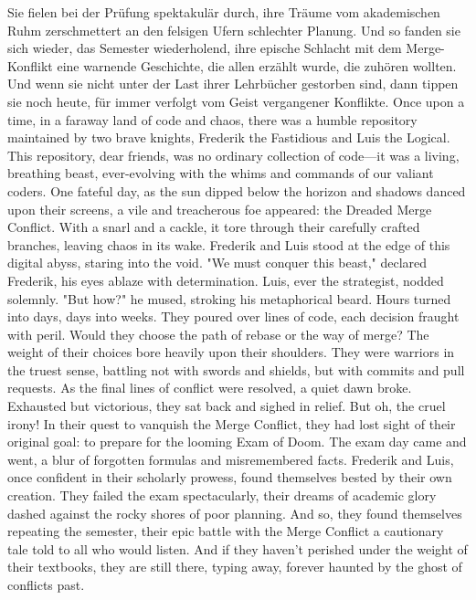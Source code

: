 {    Sie fielen bei der Prüfung spektakulär durch, ihre Träume vom akademischen Ruhm zerschmettert an den felsigen Ufern schlechter Planung.
    Und so fanden sie sich wieder, das Semester wiederholend, ihre epische Schlacht mit dem Merge-Konflikt eine warnende Geschichte, die allen erzählt wurde, die zuhören wollten.
    Und wenn sie nicht unter der Last ihrer Lehrbücher gestorben sind, dann tippen sie noch heute, für immer verfolgt vom Geist vergangener Konflikte.
}{
    Once upon a time, in a faraway land of code and chaos, there was a humble repository maintained by two brave knights, Frederik the Fastidious and Luis the Logical.
    This repository, dear friends, was no ordinary collection of code—it was a living, breathing beast, ever-evolving with the whims and commands of our valiant coders.
    One fateful day, as the sun dipped below the horizon and shadows danced upon their screens, a vile and treacherous foe appeared: the Dreaded Merge Conflict.
    With a snarl and a cackle, it tore through their carefully crafted branches, leaving chaos in its wake.
    Frederik and Luis stood at the edge of this digital abyss, staring into the void. "We must conquer this beast," declared Frederik, his eyes ablaze with determination. Luis, ever the strategist, nodded solemnly. "But how?" he mused, stroking his metaphorical beard.
    Hours turned into days, days into weeks. They poured over lines of code, each decision fraught with peril. Would they choose the path of rebase or the way of merge? The weight of their choices bore heavily upon their shoulders. They were warriors in the truest sense, battling not with swords and shields, but with commits and pull requests.
    As the final lines of conflict were resolved, a quiet dawn broke. Exhausted but victorious, they sat back and sighed in relief. But oh, the cruel irony! In their quest to vanquish the Merge Conflict, they had lost sight of their original goal: to prepare for the looming Exam of Doom.
    The exam day came and went, a blur of forgotten formulas and misremembered facts. Frederik and Luis, once confident in their scholarly prowess, found themselves bested by their own creation. They failed the exam spectacularly, their dreams of academic glory dashed against the rocky shores of poor planning.
    And so, they found themselves repeating the semester, their epic battle with the Merge Conflict a cautionary tale told to all who would listen. And if they haven't perished under the weight of their textbooks, they are still there, typing away, forever haunted by the ghost of conflicts past.
}